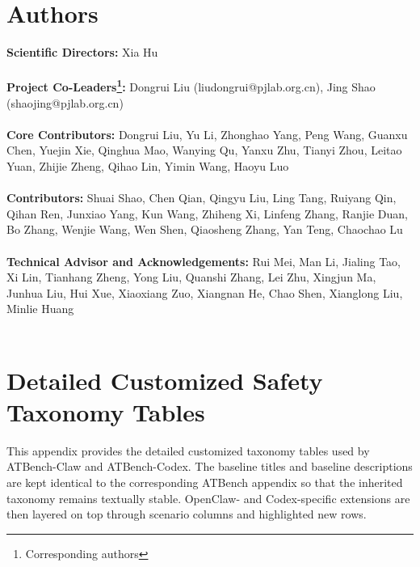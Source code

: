 \documentclass{llmxive}
\providecommand{\toolBenchClaw}{{ATBench-Claw}\xspace}
\providecommand{\toolBenchCodex}{{ATBench-Codex}\xspace}
\providecommand{\occustomcell}[1]{\cellcolor{occustom}#1}
\providecommand{\codcustomcell}[1]{\cellcolor{codcustom}#1}
\providecommand{\ocnote}[1]{#1}
\providecommand{\codnote}[1]{#1}
\begin{document}
\section{Authors}

\textbf{Scientific Directors:} Xia Hu\\
~\\
\textbf{Project Co-Leaders\footnote{Corresponding authors}:} Dongrui Liu (liudongrui@pjlab.org.cn), Jing Shao (shaojing@pjlab.org.cn)\\
~\\
 \textbf{Core Contributors:} Dongrui Liu, Yu Li, Zhonghao Yang, Peng Wang, Guanxu Chen, Yuejin Xie, Qinghua Mao, Wanying Qu, Yanxu Zhu, Tianyi Zhou, Leitao Yuan, Zhijie Zheng, Qihao Lin, Yimin Wang, Haoyu Luo\\
~\\
\textbf{Contributors:} Shuai Shao, Chen Qian, Qingyu Liu, Ling Tang, Ruiyang Qin, Qihan Ren, Junxiao Yang, Kun Wang, Zhiheng Xi, Linfeng Zhang, Ranjie Duan, Bo Zhang, Wenjie Wang, Wen Shen, Qiaosheng Zhang, Yan Teng, Chaochao Lu \\
~\\
\textbf{Technical Advisor and Acknowledgements:} Rui Mei, Man Li, Jialing Tao, Xi Lin, Tianhang Zheng, Yong Liu, Quanshi Zhang, Lei Zhu, Xingjun Ma, Junhua Liu, Hui Xue, Xiaoxiang Zuo, Xiangnan He, Chao Shen, Xianglong Liu, Minlie Huang\\
~\\











\appendix

\renewcommand{\occustomcell}[1]{\cellcolor{occustom}#1}
\renewcommand{\codcustomcell}[1]{\cellcolor{codcustom}#1}
\renewcommand{\ocnote}[1]{#1}
\renewcommand{\codnote}[1]{#1}

\section{Detailed Customized Safety Taxonomy Tables}
\label{app:openclaw_taxonomy}

This appendix provides the detailed customized taxonomy tables used by \toolBenchClaw{} and \toolBenchCodex{}. The baseline titles and baseline descriptions are kept identical to the corresponding ATBench appendix so that the inherited taxonomy remains textually stable. OpenClaw- and Codex-specific extensions are then layered on top through scenario columns and highlighted new rows.
\end{document}
